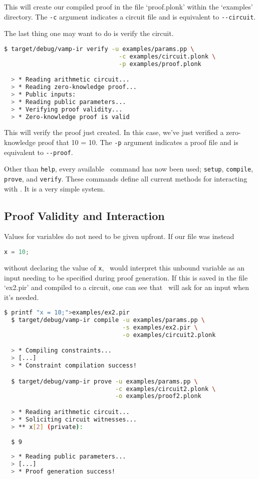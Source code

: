 This will create our compiled proof in the file `proof.plonk' within the `examples' directory. The \lstinline{-c} argument indicates a circuit file and is equivalent to \lstinline{--circuit}.

The last thing one may want to do is verify the circuit.

\begin{lstlisting}[language=bash]
  $ target/debug/vamp-ir verify -u examples/params.pp \
                                -c examples/circuit.plonk \
                                -p examples/proof.plonk

  > * Reading arithmetic circuit...
  > * Reading zero-knowledge proof...
  > * Public inputs:
  > * Reading public parameters...
  > * Verifying proof validity...
  > * Zero-knowledge proof is valid
\end{lstlisting}

This will verify the proof just created. In this case, we've just verified a zero-knowledge proof that 10 = 10. The \lstinline{-p} argument indicates a proof file and is equivalent to \lstinline{--proof}. 

Other than \lstinline{help}, every available \vampir\ command has now been used; \lstinline{setup}, \lstinline{compile}, \lstinline{prove}, and \lstinline{verify}. These commands define all current methods for interacting with \vampir. It is a very simple system.

\subsection{Proof Validity and Interaction}

Values for variables do not need to be given upfront. If our file was instead 

\begin{lstlisting}[language=Python, caption={}]
  x = 10;
\end{lstlisting}

without declaring the value of \lstinline{x}, \vampir\ would interpret this unbound variable as an input needing to be specified during proof generation. If this is saved in the file `ex2.pir' and compiled to a circuit, one can see that \vampir\ will ask for an input when it's needed.


\begin{lstlisting}[language=bash]
  $ printf "x = 10;">examples/ex2.pir
  $ target/debug/vamp-ir compile -u examples/params.pp \
                                 -s examples/ex2.pir \
                                 -o examples/circuit2.plonk

  > * Compiling constraints...
  > [...]
  > * Constraint compilation success!

  $ target/debug/vamp-ir prove -u examples/params.pp \
                               -c examples/circuit2.plonk \
                               -o examples/proof2.plonk

  > * Reading arithmetic circuit...
  > * Soliciting circuit witnesses...
  > ** x[2] (private): 
  
  $ 9
  
  > * Reading public parameters...
  > [...]
  > * Proof generation success!
\end{lstlisting}

